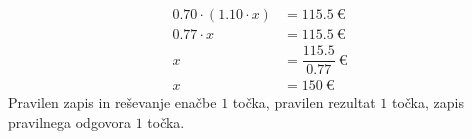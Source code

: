 \documentclass[addpoints]{exam}
\begin{document}
\begin{questions}
        \begin{solution}[4cm]
            \begin{align*}
                0.70\cdot \left(1.10\cdot x\right) &=115.5~\euro \\
                                     0.77 \cdot x &= 115.5~\euro \\
                                                x &= \dfrac{115.5}{0.77}~\euro \\
                                                x &= 150~\euro
            \end{align*}
            Pravilen zapis in reševanje enačbe $1$ točka, pravilen rezultat $1$ točka, zapis pravilnega odgovora $1$ točka.
        \end{solution}



        \newpage

    
    
    

\end{questions}
\end{document}
